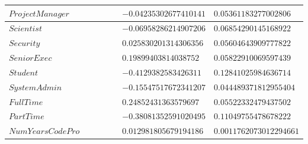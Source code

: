 \documentclass{report}
\begin{document}
\begin{longtable}{|R{0.4\linewidth}|R{0.3\linewidth}|R{0.3\linewidth}|}
  \hline
  $ProjectManager$ & $-0.04235302677410141$ & $0.05361183277002806$\\
  \hline
  $Scientist$ & $-0.06958286214907206$ & $0.06854290145168922$\\
  \hline
  $Security$ & $0.025830201314306356$ & $0.05604643909777822$\\
  \hline
  $SeniorExec$ & $0.19899403814038752$ & $0.05822910069597439$\\
  \hline
  $Student$ & $-0.4129382583426311$ & $0.12841025984636714$\\
  \hline
  $SystemAdmin$ & $-0.15547517672341207$ & $0.044489371812955404$\\
  \hline
  $FullTime$ & $0.24852431363579697$ & $0.05522332479437502$\\
  \hline
  $PartTime$ & $-0.38081352591020495$ & $0.11049755478678222$\\
  \hline
  $NumYearsCodePro$ & $0.012981805679194186$ & $0.0011762073012294661$ \\
  \hline
  \end{longtable}
\end{document}
